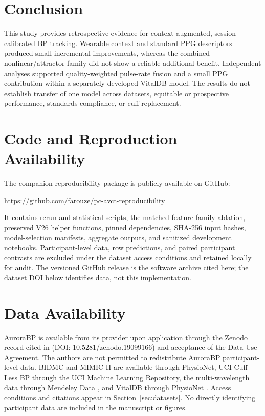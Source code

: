 \documentclass[12pt]{article}
\let\cite\citep
\begin{document}
\section{Conclusion}
\label{sec:conclusion}
This study provides retrospective evidence for context-augmented, session-calibrated BP tracking. Wearable context and standard PPG descriptors produced small incremental improvements, whereas the combined nonlinear/attractor family did not show a reliable additional benefit. Independent analyses supported quality-weighted pulse-rate fusion and a small PPG contribution within a separately developed VitalDB model. The results do not establish transfer of one model across datasets, equitable or prospective performance, standards compliance, or cuff replacement.
\section*{Code and Reproduction Availability}
The companion reproducibility package is publicly available on GitHub:
\begin{center}
\small\url{https://github.com/farouze/pc-avct-reproducibility}
\end{center}
It contains rerun and statistical scripts, the matched feature-family ablation, preserved V26 helper functions, pinned dependencies, SHA-256 input hashes, model-selection manifests, aggregate outputs, and sanitized development notebooks. Participant-level data, row predictions, and paired participant contrasts are excluded under the dataset access conditions and retained locally for audit. The versioned GitHub release is the software archive cited here; the dataset DOI below identifies data, not this implementation.
\section*{Data Availability}
AuroraBP is available from its provider upon application through the Zenodo record cited in \cite{aurorabpDataset} (DOI: 10.5281/zenodo.19099166) and acceptance of the Data Use Agreement. The authors are not permitted to redistribute AuroraBP participant-level data. BIDMC and MIMIC-II are available through PhysioNet, UCI Cuff-Less BP through the UCI Machine Learning Repository, the multi-wavelength data through Mendeley Data \cite{appel2025ppg}, and VitalDB through PhysioNet \cite{vitaldbDataset}. Access conditions and citations appear in Section~\ref{sec:datasets}. No directly identifying participant data are included in the manuscript or figures.
\end{document}
